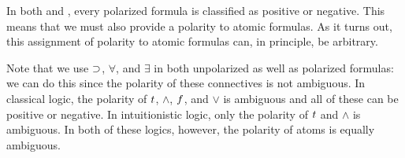 
In both \LKF and \LJF, every polarized formula is classified as
positive or negative.
%
This means that we must also provide a polarity to atomic formulas.
%
As it turns out, this assignment of polarity to atomic formulas can,
in principle, be arbitrary.
%

%
Note that we use $\supset$, $\forall$, and $\exists$ in both unpolarized
as well as polarized formulas: we can do this since the polarity of
these connectives is not ambiguous.
%
In classical logic, the polarity of $t\/$, $\wedge$, $f\/$, and
$\vee$ is ambiguous and all of these can be positive or negative.
%
In intuitionistic logic, only the polarity of $t\/$ and $\wedge$
is ambiguous.
%
In both of these logics, however, the polarity of atoms is equally
ambiguous.
%


